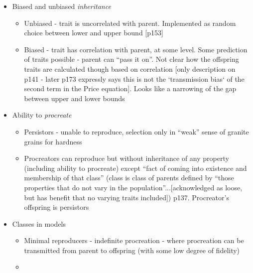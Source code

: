 \begin{itemize}
	\item
	
	Biased and unbiased \emph{inheritance}
	
	\begin{itemize}
		\item		
		Unbiased - trait is uncorrelated with parent. Implemented as
		random choice between lower and upper bound {[}p153{]}			
		\item	
		Biased - trait has correlation with parent, at some level. Some
		prediction of traits possible - parent can ``pass it on''. Not
		clear how the offspring traits are calculated though based on
		correlation {[}only description on p141 - later p173 expressly
		says this is not the `transmission bias` of the second term in the
		Price equation{]}. Looks like a narrowing of the gap between upper
		and lower bounds

	\end{itemize}
	\item
	
	Ability to \emph{procreate}	
	
	\begin{itemize}
		\item
		
		Persistors - unable to reproduce, selection only in ``weak'' sense
		of granite grains for hardness
		
		\item
		
		Procreators can reproduce but without inheritance of any property
		(including ability to procreate) except ``fact of coming into
		existence and membership of that class'' (class is class of
		parents defined by ``those properties that do not vary in the
		population''...{[}acknowledged as loose, but has benefit that no
		varying traits included{]}) p137. Procreator's offspring is
		persistors
		
	\end{itemize}
	\item
	
	Classes in models
	
	
	\begin{itemize}
		\item
		
		Minimal reproducers - indefinite procreation - where procreation
		can be transmitted from parent to offspring (with some low degree
		of fidelity)
		
		\item
		

\end{itemize}
\end{itemize}
